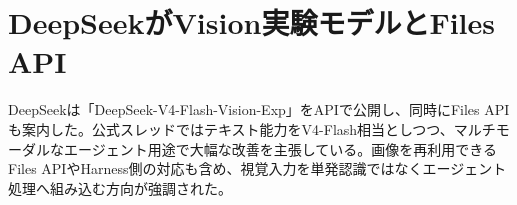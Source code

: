 \section{DeepSeekがVision実験モデルとFiles API}
DeepSeekは「DeepSeek-V4-Flash-Vision-Exp」をAPIで公開し、同時にFiles APIも案内した。公式スレッドではテキスト能力をV4-Flash相当としつつ、マルチモーダルなエージェント用途で大幅な改善を主張している。画像を再利用できるFiles APIやHarness側の対応も含め、視覚入力を単発認識ではなくエージェント処理へ組み込む方向が強調された。
